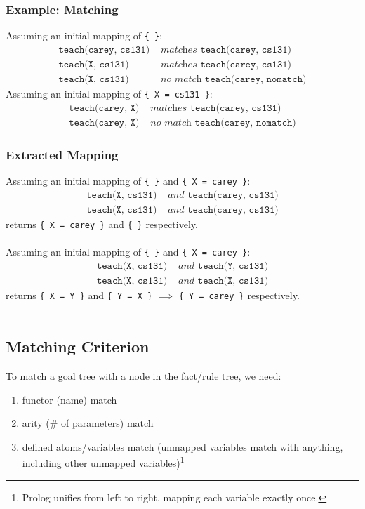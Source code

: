 \documentclass{article}
\begin{document}
\subsubsection*{Example: Matching}
Assuming an initial mapping of \texttt{\{ \}}:
\begin{align*}
  \texttt{teach(carey, cs131)} &\textit{ matches } \texttt{teach(carey,
  cs131)} \\
  \texttt{teach(X, cs131)} &\textit{ matches } \texttt{teach(carey,
  cs131)} \\
  \texttt{teach(X, cs131)} &\textit{ no match } \texttt{teach(carey,
  nomatch)}
\end{align*}
Assuming an initial mapping of \texttt{\{ X = cs131 \}}:
\begin{align*}
  \texttt{teach(carey, X)} &\textit{ matches } \texttt{teach(carey,
  cs131)} \\
  \texttt{teach(carey, X)} &\textit{ no match } \texttt{teach(carey,
  nomatch)}
\end{align*}

\subsubsection*{Extracted Mapping}
Assuming an initial mapping of \texttt{\{ \}} and \texttt{\{ X = carey
  \}}:
\begin{align*}
  \texttt{teach(X, cs131)} &\textit{ and } \texttt{teach(carey,
                             cs131)} \\
  \texttt{teach(X, cs131)} &\textit{ and } \texttt{teach(carey,
                             cs131)}
\end{align*}
returns \texttt{\{ X = carey \}} and \texttt{\{ \}} respectively. \\ \\
Assuming an initial mapping of \texttt{\{  \}} and \texttt{\{ X = carey \}}:
\begin{align*}
  \texttt{teach(X, cs131)} &\textit{ and } \texttt{teach(Y,
                             cs131)} \\
  \texttt{teach(X, cs131)} &\textit{ and } \texttt{teach(X,
                             cs131)}
\end{align*}
returns \texttt{\{ X = Y \}} and \texttt{\{ Y = X \}} $\implies$
\texttt{\{ Y = carey \}} respectively. \\ \\

\subsection{Matching Criterion}
To match a goal tree with a node in the fact/rule tree, we need:
\begin{enumerate}[label=(\roman*)]
\item functor (name) match
\item arity (\# of parameters) match
\item defined atoms/variables match (unmapped variables match with
  anything, including other unmapped variables)\footnote{Prolog
    unifies from left to right, mapping each variable exactly once.} 
\end{enumerate}
\end{document}
